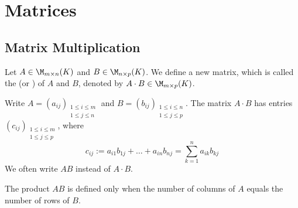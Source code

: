 \renewcommand{\thetheorem}{\arabic{chapter}.\alph{section}.\arabic{theorem}}
\setcounter{chapter}{14} %

\setcounter{chapter}{16}
\chapter{Matrices}

\section{Matrix Multiplication}

\begin{definition}
Let $A \in \M_{m \times n}(K)$ and $B \in \M_{n \times p}(K)$. We define a new matrix, which is called the  (or ) of $A$ and $B$, denoted by $A \cdot B \in \M_{m \times p}(K)$.

Write $A = (a_{ij})_{\substack{1 \le i \le m \\ 1 \le j \le n}}$ and $B = (b_{ij})_{\substack{1 \le i \le n \\ 1 \le j \le p}}$. The matrix $A \cdot B$ has entries $(c_{ij})_{\substack{1 \le i \le m \\ 1 \le j \le p}}$, where
\begin{equation*}
    c_{ij} := a_{i1}b_{1j} + \dots + a_{in}b_{nj} = \sum_{k=1}^{n} a_{ik}b_{kj}
\end{equation*}
We often write $AB$ instead of $A \cdot B$. 
\end{definition}

\begin{importantremark}
The product $AB$ is defined only when the number of columns of $A$ equals the number of rows of $B$.
\end{importantremark}

